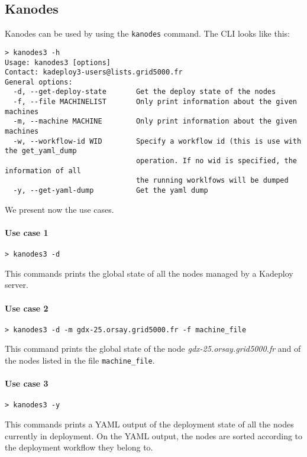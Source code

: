 \documentclass[a4wide,10pt,oneside]{book}
\begin{document}
\subsection{Kanodes}\label{sec:kanodes}
Kanodes can be used by using the \texttt{kanodes} command. The CLI looks like this:
\begin{small}
\begin{verbatim}
> kanodes3 -h
Usage: kanodes3 [options]
Contact: kadeploy3-users@lists.grid5000.fr
General options:
  -d, --get-deploy-state       Get the deploy state of the nodes
  -f, --file MACHINELIST       Only print information about the given machines
  -m, --machine MACHINE        Only print information about the given machines
  -w, --workflow-id WID        Specify a workflow id (this is use with the get_yaml_dump 
                               operation. If no wid is specified, the information of all
                               the running worklfows will be dumped
  -y, --get-yaml-dump          Get the yaml dump
\end{verbatim}
\end{small}

We present now the use cases.
\paragraph{Use case 1}
\begin{verbatim}
> kanodes3 -d
\end{verbatim}
This commands prints the global state of all the nodes managed by a Kadeploy server.

\paragraph{Use case 2}
\begin{verbatim}
> kanodes3 -d -m gdx-25.orsay.grid5000.fr -f machine_file
\end{verbatim}
This command prints the global state of the node \textit{gdx-25.orsay.grid5000.fr} and of the nodes listed in the file \texttt{machine\_file}.

\paragraph{Use case 3}
\begin{verbatim}
> kanodes3 -y
\end{verbatim}
This commands prints a YAML output of the deployment state of all the nodes currently in deployment. On the YAML output, the nodes are sorted according to the deployment workflow they belong to.
\end{document}
